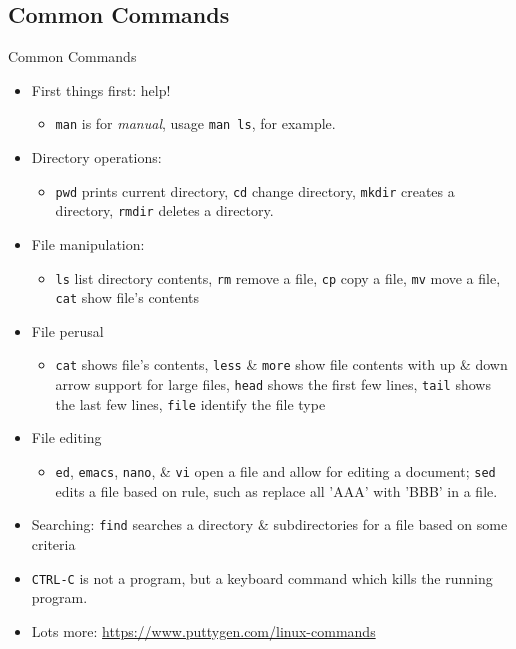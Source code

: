 \documentclass[graphics]{beamer}
\begin{document}
\subsection{Common Commands}
\begin{frame}{Common Commands}
     {
        \begin{itemize}
            \item First things first: help!
            \begin{itemize}
                \item \texttt{man} is for \textit{manual}, usage \texttt{man ls}, for example.
            \end{itemize}
            \item Directory operations:
            \begin{itemize}
                \item \texttt{pwd} prints current directory, \texttt{cd} change directory, \texttt{mkdir} creates a directory, \texttt{rmdir} deletes a directory.
            \end{itemize}
            \item File manipulation:
            \begin{itemize}
                \item \texttt{ls} list directory contents, \texttt{rm} remove a file, \texttt{cp} copy a file, \texttt{mv} move a file, \texttt{cat} show file's contents
            \end{itemize}
            \item File perusal
            \begin{itemize}
                \item \texttt{cat} shows file's contents, \texttt{less} \& \texttt{more} show file contents with up \& down arrow support for large files, \texttt{head} shows the first few lines, \texttt{tail} shows the last few lines, \texttt{file} identify the file type
            \end{itemize}
        \end{itemize}
    }
     {
        \begin{itemize}
            \item File editing
            \begin{itemize}
                \item \texttt{ed}, \texttt{emacs}, \texttt{nano}, \& \texttt{vi} open a file and allow for editing a document; \texttt{sed} edits a file based on rule, such as replace all 'AAA' with 'BBB' in a file.
            \end{itemize}
            \item Searching: \texttt{find} searches a directory \& subdirectories for a file based on some criteria
            \item \texttt{CTRL-C} is not a program, but a keyboard command which kills the running program.
            \item Lots more: \url{https://www.puttygen.com/linux-commands}
        \end{itemize}
    }
\end{frame}
\end{document}
